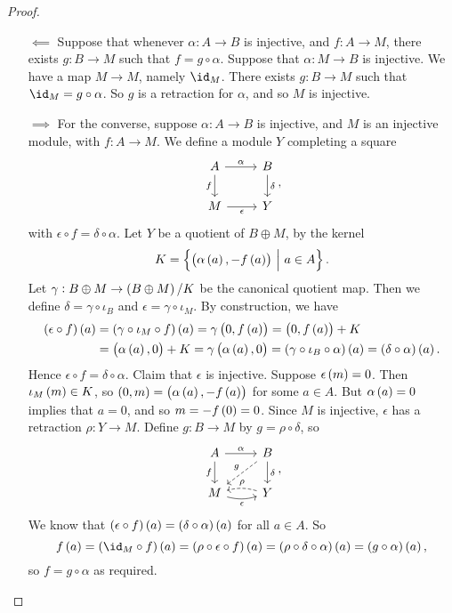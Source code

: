 \begin{proof}
\hfill
\begin{itemize}
\item[$ \impliedby $] Suppose that whenever $ \alpha : A \to B $ is injective, and $ f : A \to M $, there exists $ g : B \to M $ such that $ f = g \circ \alpha $. Suppose that $ \alpha : M \to B $ is injective. We have a map $ M \to M $, namely $ \id_M $. There exists $ g : B \to M $ such that $ \id_M = g \circ \alpha $. So $ g $ is a retraction for $ \alpha $, and so $ M $ is injective.
\item[$ \implies $] For the converse, suppose $ \alpha : A \to B $ is injective, and $ M $ is an injective module, with $ f : A \to M $. We define a module $ Y $ completing a square
$$
\begin{tikzcd}
A \arrow{r}{\alpha} \arrow[swap]{d}{f} & B \arrow{d}{\delta} \\
M \arrow[swap]{r}{\epsilon} & Y
\end{tikzcd},
$$
with $ \epsilon \circ f = \delta \circ \alpha $. Let $ Y $ be a quotient of $ B \oplus M $, by the kernel
$$ K = \cbr{\br{\alpha\br{a}, -f\br{a}} \st a \in A}. $$
Let $ \gamma : B \oplus M \to \br{B \oplus M} / K $ be the canonical quotient map. Then we define $ \delta = \gamma \circ \iota_B $ and $ \epsilon = \gamma \circ \iota_M $. By construction, we have
\begin{align*}
\br{\epsilon \circ f}\br{a}
& = \br{\gamma \circ \iota_M \circ f}\br{a}
= \gamma\br{0, f\br{a}}
= \br{0, f\br{a}} + K \\
& = \br{\alpha\br{a}, 0} + K
= \gamma\br{\alpha\br{a}, 0}
= \br{\gamma \circ \iota_B \circ \alpha}\br{a}
= \br{\delta \circ \alpha}\br{a}.
\end{align*}
Hence $ \epsilon \circ f = \delta \circ \alpha $. Claim that $ \epsilon $ is injective. Suppose $ \epsilon\br{m} = 0 $. Then $ \iota_M\br{m} \in K $, so $ \br{0, m} = \br{\alpha\br{a}, -f\br{a}} $ for some $ a \in A $. But $ \alpha\br{a} = 0 $ implies that $ a = 0 $, and so $ m = -f\br{0} = 0 $. Since $ M $ is injective, $ \epsilon $ has a retraction $ \rho : Y \to M $. Define $ g : B \to M $ by $ g = \rho \circ \delta $, so
$$
\begin{tikzcd}
A \arrow{r}{\alpha} \arrow[swap]{d}{f} & B \arrow[dashed, swap]{dl}{g} \arrow{d}{\delta} \\
M \arrow[bend right=15, swap]{r}{\epsilon} & Y \arrow[bend right=15, dashed, swap]{l}{\rho}
\end{tikzcd},
$$
We know that $ \br{\epsilon \circ f}\br{a} = \br{\delta \circ \alpha}\br{a} $ for all $ a \in A $. So
$$ f\br{a} = \br{\id_M \circ f}\br{a} = \br{\rho \circ \epsilon \circ f}\br{a} = \br{\rho \circ \delta \circ \alpha}\br{a} = \br{g \circ \alpha}\br{a}, $$
so $ f = g \circ \alpha $ as required.
\end{itemize}
\end{proof}

